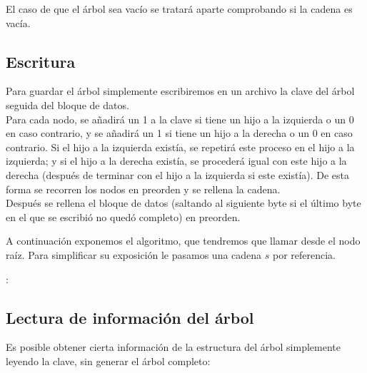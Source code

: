 \documentclass{article}
\newenvironment{algo}{
\vspace*{0.5cm}
\begin{algorithm}[H]}{
\end{algorithm}
\vspace*{0.5cm}
}
\begin{document}
El caso de que el árbol sea vacío se tratará aparte comprobando si la cadena es
vacía.

\subsection{Escritura}

Para guardar el árbol simplemente escribiremos en un archivo la clave del árbol
seguida del bloque de datos. \\

Para cada nodo, se añadirá un 1 a la clave si tiene un hijo a la izquierda o un 0
en caso contrario, y se añadirá un 1 si tiene un hijo a la derecha o un 0 en caso
contrario. Si el hijo a la izquierda existía, se repetirá este proceso en el hijo
a la izquierda; y si el hijo a la derecha existía, se procederá igual con este hijo
a la derecha (después de terminar con el hijo a la izquierda si este existía). De
esta forma se recorren los nodos en preorden y se rellena la cadena. \\

Después se rellena el bloque de datos (saltando al siguiente byte si el último
byte en el que se escribió no quedó completo) en preorden.

A continuación exponemos el algoritmo, que tendremos que llamar desde el nodo
raíz. Para simplificar su exposición le pasamos una cadena $s$ por referencia.

\begin{algo}
: \\

\BlankLine


\BlankLine


\end{algo}

\subsection{Lectura de información del árbol}

Es posible obtener cierta información de la estructura del árbol simplemente
leyendo la clave, sin generar el árbol completo:
\end{document}
